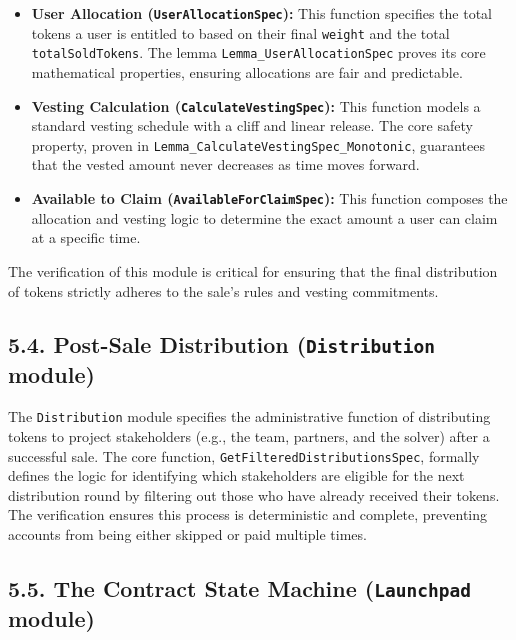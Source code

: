 \documentclass[
  english,
  onecolumn]{article}
\providecommand{\tightlist}{%
  \setlength{\itemsep}{0pt}\setlength{\parskip}{0pt}}
\begin{document}
\begin{itemize}
\tightlist
\item
  \textbf{User Allocation (\texttt{UserAllocationSpec}):} This function
  specifies the total tokens a user is entitled to based on their final
  \texttt{weight} and the total \texttt{totalSoldTokens}. The lemma
  \texttt{Lemma\_UserAllocationSpec} proves its core mathematical
  properties, ensuring allocations are fair and predictable.
\item
  \textbf{Vesting Calculation (\texttt{CalculateVestingSpec}):} This
  function models a standard vesting schedule with a cliff and linear
  release. The core safety property, proven in
  \texttt{Lemma\_CalculateVestingSpec\_Monotonic}, guarantees that the
  vested amount never decreases as time moves forward.
\item
  \textbf{Available to Claim (\texttt{AvailableForClaimSpec}):} This
  function composes the allocation and vesting logic to determine the
  exact amount a user can claim at a specific time.
\end{itemize}

The verification of this module is critical for ensuring that the final
distribution of tokens strictly adheres to the sale's rules and vesting
commitments.

\subsection{\texorpdfstring{5.4. Post-Sale Distribution
(\texttt{Distribution}
module)}{5.4. Post-Sale Distribution (Distribution module)}}\label{post-sale-distribution-distribution-module}

The \texttt{Distribution} module specifies the administrative function
of distributing tokens to project stakeholders (e.g., the team,
partners, and the solver) after a successful sale. The core function,
\texttt{GetFilteredDistributionsSpec}, formally defines the logic for
identifying which stakeholders are eligible for the next distribution
round by filtering out those who have already received their tokens. The
verification ensures this process is deterministic and complete,
preventing accounts from being either skipped or paid multiple times.

\subsection{\texorpdfstring{5.5. The Contract State Machine
(\texttt{Launchpad}
module)}{5.5. The Contract State Machine (Launchpad module)}}\label{the-contract-state-machine-launchpad-module}
\end{document}
